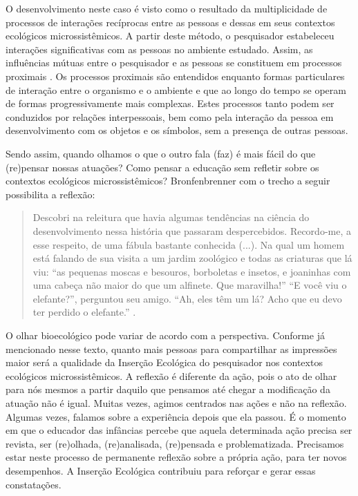 \documentclass{textolivre}
\begin{document}
O desenvolvimento neste caso é visto como o resultado da multiplicidade de processos de interações recíprocas entre as pessoas e dessas em seus contextos ecológicos microssistêmicos. A partir deste método, o pesquisador estabeleceu interações significativas com as pessoas no ambiente estudado. Assim, as influências mútuas entre o pesquisador e as pessoas se constituem em processos proximais \cite{brofen2011}. Os processos proximais são entendidos enquanto formas particulares de interação entre o organismo e o ambiente e que ao longo do tempo se operam de formas progressivamente mais complexas. Estes processos tanto podem ser conduzidos por relações interpessoais, bem como pela interação da pessoa em desenvolvimento com os objetos e os símbolos, sem a presença de outras pessoas. 

Sendo assim, quando olhamos o que o outro fala (faz) é mais fácil do que (re)pensar nossas atuações? Como pensar a educação sem refletir sobre os contextos ecológicos microssistêmicos? Bronfenbrenner com o trecho a seguir possibilita a reflexão: 


\begin{quote}
Descobri na releitura que havia algumas tendências na ciência do desenvolvimento nessa história que passaram despercebidos. Recordo-me, a esse respeito, de uma fábula bastante conhecida (...). Na qual um homem está falando de sua visita a um jardim zoológico e todas as criaturas que lá viu: “as pequenas moscas e besouros, borboletas e insetos, e joaninhas com uma cabeça não maior do que um alfinete. Que maravilha!” “E você viu o elefante?”, perguntou seu amigo. “Ah, eles têm um lá? Acho que eu devo ter perdido o elefante.” \cite[p. 95-96]{brofen2011}.   
\end{quote}

O olhar bioecológico pode variar de acordo com a perspectiva. Conforme já mencionado nesse texto, quanto mais pessoas para compartilhar as impressões maior será a qualidade da Inserção Ecológica do pesquisador nos contextos ecológicos microssistêmicos. A reflexão é diferente da ação, pois o ato de olhar para nós mesmos a partir daquilo que pensamos até chegar a modificação da atuação não é igual. Muitas vezes, agimos centrados nas ações e não na reflexão. Algumas vezes, falamos sobre a experiência depois que ela passou. É o momento em que o educador das infâncias percebe que aquela determinada ação precisa ser revista, ser (re)olhada, (re)analisada, (re)pensada e problematizada. Precisamos estar neste processo de permanente reflexão sobre a própria ação, para ter novos desempenhos. A Inserção Ecológica contribuiu para reforçar e gerar essas constatações.  
\end{document}

